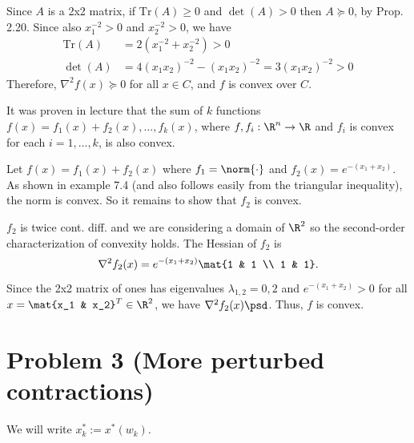 \documentclass{homework}
\begin{document}
\begin{letterenum}
    Since $A$ is a 2x2 matrix, if $\text{Tr}(A) \geq 0$ and $\det(A) > 0$ then 
    $A \succeq 0$, by Prop. 2.20. Since also $x_1^{-2} > 0$ and $x_2^{-2} > 0$,
    we have
    \begin{align}
        \text{Tr}(A) &= 2(x_1^{-2} + x_2^{-2}) > 0 \\
        \det(A) &= 4(x_1x_2)^{-2} - (x_1x_2)^{-2} = 3 (x_1x_2)^{-2} > 0
    \end{align}
    Therefore, $\nabla^2 f(x) \succeq 0$ for all $x \in C$, and $f$ is convex
    over $C$.

    \item It was proven in lecture that the sum of $k$ functions
    $f(x) = f_1(x) + f_2(x), \dots, f_k(x)$, where $f, f_i: \R^n \to \R$ and $f_i$ is convex
    for each $i = 1,\dots,k$, is also convex.

    Let $f(x) = f_1(x) + f_2(x)$ where $f_1 = \norm{\cdot}$ and
    $f_2(x) = e^{-(x_1 + x_2)}$. As shown in example 7.4 (and also follows
    easily from the triangular inequality), the norm is convex. So it remains
    to show that $f_2$ is convex.

    $f_2$ is twice cont. diff. and we are considering a domain of $\R^2$ so 
    the second-order characterization of convexity holds. The Hessian of $f_2$
    is
    \begin{equation}
        \nabla^2 f_2(x) = e^{-(x_1 + x_2)} \mat{1 & 1 \\ 1 & 1}.
    \end{equation}
    Since the 2x2 matrix of ones has eigenvalues $\lambda_{1,2} = 0,2$
    and $e^{-(x_1 + x_2)} > 0$ for all $x = \mat{x_1 & x_2}^T \in \R^2$,
    we have $\nabla^2 f_2(x) \psd$. Thus, $f$ is convex.
\end{letterenum}

\section{Problem 3 (More perturbed contractions)}

We will write $x_k^* := x^*(w_k)$.
\end{document}

